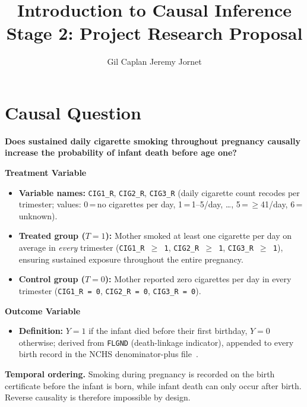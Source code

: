 \documentclass[11pt]{article}
\title{\textbf{Introduction to Causal Inference}\\[0.4em]
\large Stage 2: Project Research Proposal}
\author{Gil Caplan \quad Jeremy Jornet}
\date{}
\begin{document}
\maketitle

\section{Causal Question}

\begin{center}
\textbf{Does sustained daily cigarette smoking throughout pregnancy causally\\
increase the probability of infant death before age one?}
\end{center}

\textbf{Treatment Variable}
\begin{itemize}[noitemsep, topsep=2pt]
  \item \textbf{Variable names:} \texttt{CIG1\_R}, \texttt{CIG2\_R}, \texttt{CIG3\_R}
        (daily cigarette count recodes per trimester;
        values: 0\,=\,no cigarettes per day, 1\,=\,1--5/day, \ldots,
        5\,=\,$\geq$41/day, 6\,=\,unknown).
  \item \textbf{Treated group ($T=1$):} Mother smoked at least one cigarette
        per day on average in \emph{every} trimester
        (\texttt{CIG1\_R\,$\geq$\,1}, \texttt{CIG2\_R\,$\geq$\,1},
        \texttt{CIG3\_R\,$\geq$\,1}), ensuring sustained exposure
        throughout the entire pregnancy.
  \item \textbf{Control group ($T=0$):} Mother reported zero cigarettes per day
        in every trimester (\texttt{CIG1\_R\,=\,0}, \texttt{CIG2\_R\,=\,0},
        \texttt{CIG3\_R\,=\,0}).
\end{itemize}

\textbf{Outcome Variable}
\begin{itemize}[noitemsep, topsep=2pt]
  \item \textbf{Definition:} $Y=1$ if the infant died before their first birthday, $Y=0$ otherwise; derived from \texttt{FLGND} (death-linkage indicator), appended to every birth record in the NCHS denominator-plus file~\cite{nchs2015}.
\end{itemize}

\textbf{Temporal ordering.}
Smoking during pregnancy is recorded on the birth certificate before the
infant is born, while infant death can only occur after birth. Reverse
causality is therefore impossible by design.
\end{document}

